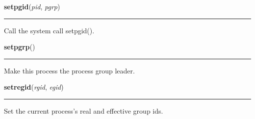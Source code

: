     \vspace{0.5ex}

\hspace{.8\funcindent}\begin{boxedminipage}{\funcwidth}

    \raggedright \textbf{setpgid}(\textit{pid}, \textit{pgrp})

    \vspace{-1.5ex}

    \rule{\textwidth}{0.5\fboxrule}
\setlength{\parskip}{2ex}
    Call the system call setpgid().

\setlength{\parskip}{1ex}
    \end{boxedminipage}

    \label{os:setpgrp}

    \vspace{0.5ex}

\hspace{.8\funcindent}\begin{boxedminipage}{\funcwidth}

    \raggedright \textbf{setpgrp}()

    \vspace{-1.5ex}

    \rule{\textwidth}{0.5\fboxrule}
\setlength{\parskip}{2ex}
    Make this process the process group leader.

\setlength{\parskip}{1ex}
    \end{boxedminipage}

    \label{os:setregid}

    \vspace{0.5ex}

\hspace{.8\funcindent}\begin{boxedminipage}{\funcwidth}

    \raggedright \textbf{setregid}(\textit{rgid}, \textit{egid})

    \vspace{-1.5ex}

    \rule{\textwidth}{0.5\fboxrule}
\setlength{\parskip}{2ex}
    Set the current process's real and effective group ids.

\setlength{\parskip}{1ex}
    \end{boxedminipage}

    \label{os:setreuid}

    \vspace{0.5ex}

